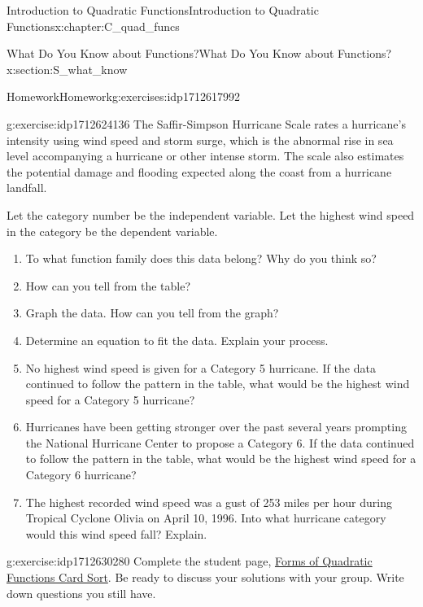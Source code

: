\documentclass[oneside,10pt,]{book}
\numberwithin{equation}{chapter}
\begin{document}
\begin{chapterptx}{Introduction to Quadratic Functions}{}{Introduction to Quadratic Functions}{}{}{x:chapter:C_quad_funcs}
\begin{sectionptx}{What Do You Know about Functions?}{}{What Do You Know about Functions?}{}{}{x:section:S_what_know}
\begin{exercises-subsection}{Homework}{}{Homework}{}{}{g:exercises:idp1712617992}
\begin{divisionexercise}{2}{}{}{g:exercise:idp1712624136}
The Saffir-Simpson Hurricane Scale rates a hurricane's intensity using wind speed and storm surge, which is the abnormal rise in sea level accompanying a hurricane or other intense storm. The scale also estimates the potential damage and flooding expected along the coast from a hurricane landfall. \footnotemark{}%
\par
Let the category number be the independent variable. Let the highest wind speed in the category be the dependent variable.%
\begin{enumerate}[font=\bfseries,label=(\alph*),ref=\alph*]
\item{}To what function family does this data belong? Why do you think so?%
\item{}How can you tell from the table?%
\item{}Graph the data. How can you tell from the graph?%
\item{}Determine an equation to fit the data. Explain your process.%
\item{}No highest wind speed is given for a Category 5 hurricane. If the data continued to follow the pattern in the table, what would be the highest wind speed for a Category 5 hurricane?%
\item{}Hurricanes have been getting stronger over the past several years prompting the National Hurricane Center to propose a Category 6. If the data continued to follow the pattern in the table, what would be the highest wind speed for a Category 6 hurricane?%
\item{}The highest recorded wind speed was a gust of 253 miles per hour during Tropical Cyclone Olivia on April 10, 1996. Into what hurricane category would this wind speed fall? Explain.%
\end{enumerate}
\end{divisionexercise}%
%
%
\begin{divisionexercise}{3}{}{}{g:exercise:idp1712630280}%
Complete the student page, \hyperref[x:worksheet:act-quad-forms-card-sort]{Forms of Quadratic Functions Card Sort}. Be ready to discuss your solutions with your group. Write down questions you still have.%
\end{divisionexercise}%
\end{exercises-subsection}
%
%
\typeout{************************************************}

\end{sectionptx}
\end{chapterptx}
\end{document}
